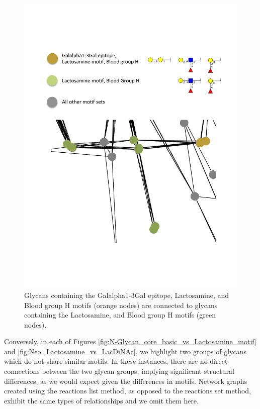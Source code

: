 \documentclass[12pt,a4paper]{article}
\begin{document}
\begin{figure}[H]
\centering 
\includegraphics[scale=0.85]{motif_similarity_exploration/Galalpha1-3Gal_epitope__Lactosamine_motif__Blood_group_H_vs_Lactosamine_motif__Blood_group_H.pdf} 
\caption{Glycans containing the Galalpha1-3Gal epitope, Lactosamine, and Blood group H motifs (orange nodes) are connected to glycans containing the Lactosamine, and Blood group H motifs (green nodes).}
\label{fig:Galalpha1-3Gal_epitope_Lactosamine_motif_Blood_group_H_vs_Lactosamine_motif_Blood_group_H}
\end{figure}

Conversely, in each of Figures \ref{fig:N-Glycan_core_basic_vs_Lactosamine_motif} and \ref{fig:Neo_Lactosamine_vs_LacDiNAc}, we highlight two groups of glycans which do not share similar motifs. In these instances, there are no direct connections between the two glycan groups, implying significant structural differences, as we would expect given the differences in motifs. Network graphs created using the reactions list method, as opposed to the reactions set method, exhibit the same types of relationships and we omit them here.
\end{document}
